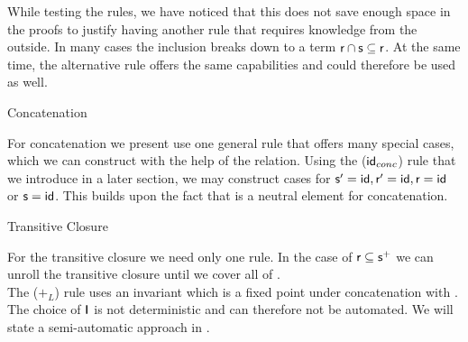 \documentclass[a4paper,twoside,12pt, english]{article}
\begin{document}
While testing the rules, we have noticed that this does not save enough space in the proofs to justify having another rule that requires knowledge from the outside. In many cases the inclusion breaks down to a term $\textsf{\upshape r} \cap \textsf{\upshape s} \subseteq \textsf{\upshape r}$.
At the same time, the alternative rule offers the same capabilities and could therefore be used as well.
\begin{rules}{Concatenation}
{}
\end{rules}
For concatenation we present use one general rule that offers many special cases, which we can construct with the help of the \id{} relation. Using the ($\textsf{\upshape id}_{conc}$) rule that we introduce in a later section, we may construct cases for $\textsf{\upshape s}' = \textsf{\upshape id}, \textsf{\upshape r}' = \textsf{\upshape id}, \textsf{\upshape r} = \textsf{\upshape id}$ or $\textsf{\upshape s}= \textsf{\upshape id}$. This builds upon the fact that \id{} is a neutral element for concatenation. %
\begin{rules}{Transitive Closure}
\end{rules}
For the transitive closure we need only one rule. In the case of $\textsf{\upshape r} \subseteq \textsf{\upshape s}^+$ we can unroll the transitive closure until we cover all of \relr. \\
The ($+_L$) rule uses an invariant \relI{} which is a fixed point under concatenation with \relr.
The choice of $\textsf{\upshape I}$ is not deterministic and can therefore not be automated. We will state a semi-automatic approach in .
\end{document}
